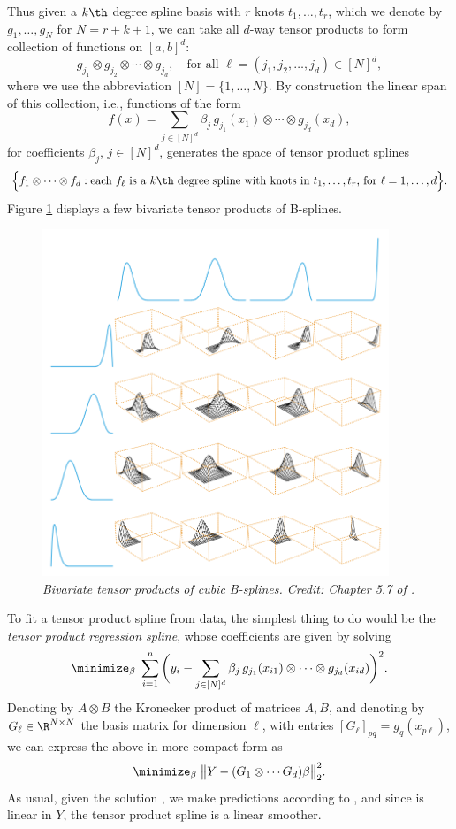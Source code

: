 \documentclass{article}
\begin{document}
Thus given a $k\th$ degree spline basis with $r$ knots $t_1,\dots,t_r$, which we
denote by $g_1,\dots,g_N$ for $N=r+k+1$, we can take all $d$-way tensor
products to form collection of functions on $[a,b]^d$:
\[
g_{j_1} \otimes g_{j_2} \otimes \cdots \otimes g_{j_d}, \quad \text{for all
  $\ell = (j_1, j_2, \dots, j_d) \in [N]^d$}, 
\]
where we use the abbreviation $[N] = \{1,\dots,N\}$. By construction the linear
span of this collection, i.e., functions of the form    
\[
f(x) = \sum_{j \in [N]^d} \beta_j \, g_{j_1}(x_1) \otimes \cdots \otimes 
g_{j_d}(x_d),   
\]
for coefficients $\beta_j$, $j \in [N]^d$, generates the space of tensor 
product splines 
\[
\Big\{ f_1 \otimes \cdots \otimes f_d : \text{each $f_\ell$ is a $k\th$ degree
  spline with knots in $t_1,\dots,t_r$, for $\ell=1,\dots,d$} \Big\}.  
\]
Figure \ref{fig:tensor} displays a few bivariate tensor products of B-splines. 

\begin{figure}[!t]
\centering
\includegraphics[width=0.925\textwidth]{tensor.png}
\caption{\it Bivariate tensor products of cubic B-splines. Credit: Chapter 5.7
  of \citet{hastie2009elements}.}    
\label{fig:tensor}
\end{figure}

To fit a tensor product spline from data, the simplest thing to do would be the 
\emph{tensor product regression spline}, whose coefficients are given by solving  
\[
\minimize_\beta \; \sum_{i=1}^n \bigg(y_i -  \sum_{j \in [N]^d} \beta_j \,
g_{j_1}(x_{i1}) \otimes \cdots \otimes g_{j_d}(x_{id}) \bigg)^2. 
\]
Denoting by $A \otimes B$ the Kronecker product of matrices $A,B$, and denoting
by $G_\ell \in \R^{N \times N}$ the basis matrix for dimension $\ell$, with
entries $[G_\ell]_{pq} = g_q(x_{p\ell})$, we can express the above in more
compact form as  
\[
\minimize_\beta \; \big\| Y - (G_1 \otimes \cdots G_d) \beta \big\|_2^2. 
\]
As usual, given the solution \smash{$\hbeta$},  we make predictions according to
, and since \smash{$\hbeta$} is linear in $Y$, the
tensor product spline \smash{$\hf$} is a linear smoother.
\end{document}
